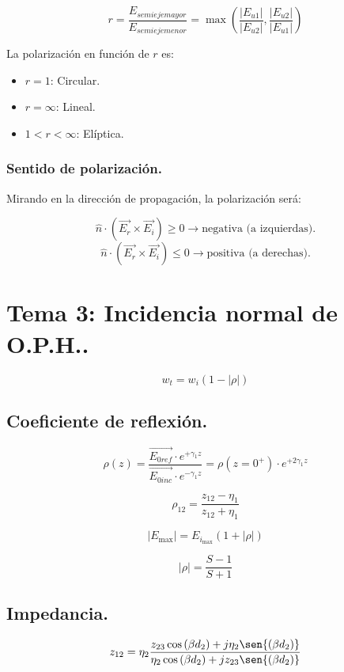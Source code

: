 \documentclass[12pt,a4paper]{article}
\begin{document}
\[ r = \frac{E_{semieje mayor}}{E_{semieje menor}} = \max{\left(
\frac{|E_{u1}|}{|E_{u2}|}, \frac{|E_{u2}|}{|E_{u1}|} \right)} \] 

La polarización en función de $r$ es:

\begin{itemize}
    \item $r=1$: Circular.
    \item $r=\infty$: Lineal.
    \item $1<r<\infty$: Elíptica.
\end{itemize}

\subsubsection{Sentido de polarización.}
\label{ssub:sentido_de_polarizacion}

Mirando en la dirección de propagación, la polarización será:

\[ \hat{n} \cdot \left( \vec{E_r} \times \vec{E_i} \right) \geq 0
\rightarrow \mbox{negativa (a izquierdas)}. \]
\[ \hat{n} \cdot \left( \vec{E_r} \times \vec{E_i} \right) \leq 0
\rightarrow \mbox{positiva (a derechas)}. \]

\section{Tema 3: Incidencia normal de O.P.H..}

\[ w_{t} = w_{i} (1 - |\rho|) \]

\subsection{Coeficiente de reflexión.}
\label{sub:coeficiente_de_reflexion}

\[ \rho (z) = \frac{\vec{E_{0 ref}} \cdot e^{+\gamma_1 z}}{\vec{E_{0 inc}}
\cdot e^{-\gamma_1 z}} = \rho (z=0^+) \cdot e^{+2\gamma_1 z} \]

\[ \rho_{12} = \frac{z_{12} - \eta_1}{z_{12} + \eta_1} \]

\[ |E_{\max}| = E_{i_{\max}} (1 + |\rho|) \]

\[ |\rho| = \frac{S-1}{S+1} \] 

\subsection{Impedancia.}
\label{sub:impedancia}

\[ z_{12} = \eta_2
\frac{z_{23} \cos{(\beta d_2)} + j \eta_2 \sen{(\beta d_2)}}
{\eta_2 \cos{(\beta d_2)} + j z_{23} \sen{(\beta d_2)}} \]
\end{document}
